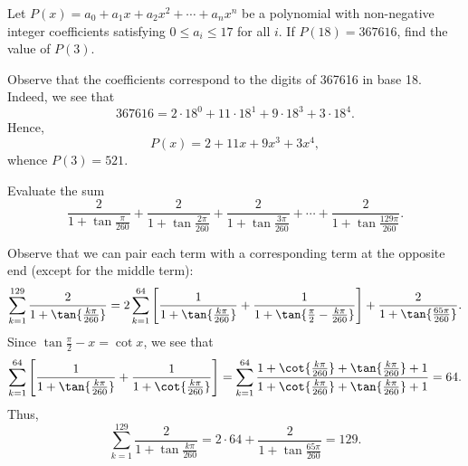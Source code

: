 \begin{question}[521]\label{A::2024-S-1-21}
    Let $P(x) = a_0 + a_1 x + a_2 x^2 + \cdots + a_n x^n$ be a polynomial with non-negative integer coefficients satisfying $0 \leq a_i \leq 17$ for all $i$. If $P(18) = 367616$, find the value of $P(3)$.
\end{question}
\begin{solution*}
    Observe that the coefficients correspond to the digits of 367616 in base 18. Indeed, we see that \[367616 = 2 \cdot 18^0 + 11 \cdot 18^1 + 9 \cdot 18^3 + 3 \cdot 18^4.\] Hence, \[P(x) = 2 + 11x + 9x^3 + 3x^4,\] whence $P(3) = 521$.
\end{solution*}

\begin{question}[129]\label{A::2024-S-1-22}
    Evaluate the sum \[\frac{2}{1 + \tan{\frac{\pi}{260}}} + \frac{2}{1 + \tan{\frac{2\pi}{260}}} + \frac{2}{1 + \tan{\frac{3\pi}{260}}} + \cdots + \frac{2}{1 + \tan{\frac{129\pi}{260}}}.\]
\end{question}
\begin{solution*}
    Observe that we can pair each term with a corresponding term at the opposite end (except for the middle term): \[\sum_{k = 1}^{129} \frac{2}{1 + \tan{\frac{k\pi}{260}}} = 2\sum_{k = 1}^{64} \bs{\frac{1}{1 + \tan{\frac{k\pi}{260}}} + \frac{1}{1 + \tan{\frac\pi2 - \frac{k\pi}{260}}}} + \frac{2}{1 + \tan{\frac{65\pi}{260}}}.\] Since $\tan{\frac\pi2 - x} = \cot x$, we see that \[\sum_{k = 1}^{64} \bs{\frac{1}{1 + \tan{\frac{k\pi}{260}}} + \frac{1}{1 + \cot{\frac{k\pi}{260}}}} = \sum_{k = 1}^{64} \frac{1 + \cot{\frac{k\pi}{260}} + \tan{\frac{k\pi}{260}} + 1}{1 + \cot{\frac{k\pi}{260}} + \tan{\frac{k\pi}{260}} + 1} = 64.\] Thus, \[\sum_{k = 1}^{129} \frac{2}{1 + \tan{\frac{k\pi}{260}}} = 2 \cdot 64 + \frac{2}{1 + \tan{\frac{65\pi}{260}}} = 129.\]
\end{solution*}

